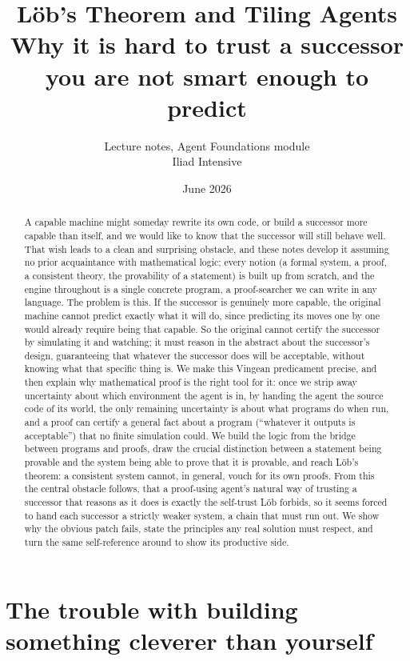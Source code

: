 \documentclass[10pt]{article}
\title{L\"ob's Theorem and Tiling Agents \\[1ex]
{\large Why it is hard to trust a successor you are not smart enough to predict}}
\author{Lecture notes, Agent Foundations module \\ Iliad Intensive}
\date{June 2026}
\theoremstyle{definition}
\theoremstyle{remark}
\begin{document}
\maketitle

\begin{abstract}
A capable machine might someday rewrite its own code, or build a successor more capable than itself, and we would like to know that the successor will still behave well. That wish leads to a clean and surprising obstacle, and these notes develop it assuming no prior acquaintance with mathematical logic; every notion (a formal system, a proof, a consistent theory, the provability of a statement) is built up from scratch, and the engine throughout is a single concrete program, a proof-searcher we can write in any language. The problem is this. If the successor is genuinely more capable, the original machine cannot predict exactly what it will do, since predicting its moves one by one would already require being that capable. So the original cannot certify the successor by simulating it and watching; it must reason in the abstract about the successor's design, guaranteeing that whatever the successor does will be acceptable, without knowing what that specific thing is. We make this Vingean predicament precise, and then explain why mathematical proof is the right tool for it: once we strip away uncertainty about which environment the agent is in, by handing the agent the source code of its world, the only remaining uncertainty is about what programs do when run, and a proof can certify a general fact about a program (``whatever it outputs is acceptable'') that no finite simulation could. We build the logic from the bridge between programs and proofs, draw the crucial distinction between a statement being provable and the system being able to prove that it is provable, and reach L\"ob's theorem: a consistent system cannot, in general, vouch for its own proofs. From this the central obstacle follows, that a proof-using agent's natural way of trusting a successor that reasons as it does is exactly the self-trust L\"ob forbids, so it seems forced to hand each successor a strictly weaker system, a chain that must run out. We show why the obvious patch fails, state the principles any real solution must respect, and turn the same self-reference around to show its productive side.
\end{abstract}

\tableofcontents

\section{The trouble with building something cleverer than yourself}
\label{sec:intro}
\end{document}
